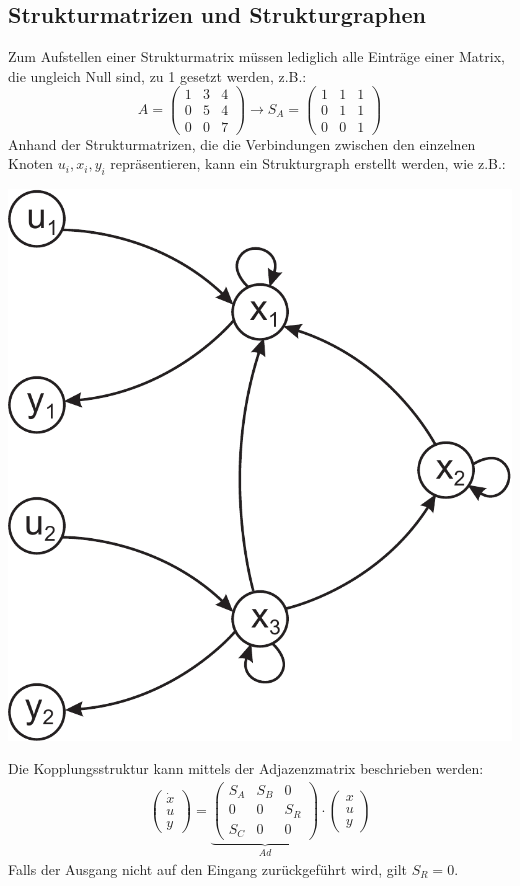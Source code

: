 \documentclass[a4paper,twocolumn,10pt]{article}
\begin{document}
\subsection{Strukturmatrizen und Strukturgraphen}
Zum Aufstellen einer Strukturmatrix müssen lediglich alle Einträge einer Matrix, die ungleich Null sind, zu 1 gesetzt werden, z.B.:
\begin{equation*}
A=\begin{pmatrix}1 & 3 & 4 \\ 0 & 5 & 4 \\ 0 & 0 & 7\end{pmatrix}\rightarrow S_A=\begin{pmatrix}1 & 1 & 1 \\ 0 & 1 & 1 \\ 0 & 0 & 1\end{pmatrix}
\end{equation*}
Anhand der Strukturmatrizen, die die Verbindungen zwischen den einzelnen Knoten $u_i, x_i,y_i$ repräsentieren, kann ein Strukturgraph erstellt werden, wie z.B.:
\begin{center}
\includegraphics[width=0.6\columnwidth]{Grafiken/Strukturgraph}
\end{center}
Die Kopplungsstruktur kann mittels der Adjazenzmatrix beschrieben werden:
\begin{align*}
\begin{pmatrix}\dot{x} \\ u \\ y\end{pmatrix}=\underbrace{\begin{pmatrix}S_A & S_B & 0 \\ 0 & 0 & S_R \\ S_C & 0 & 0\end{pmatrix}}_{Ad}\cdot\begin{pmatrix}x \\ u \\ y\end{pmatrix}
\end{align*}
Falls der Ausgang nicht auf den Eingang zurückgeführt wird, gilt $S_R=0$.
\end{document}
